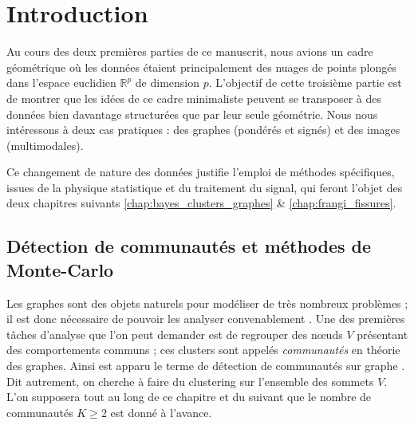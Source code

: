 \chapter{Introduction}
\label{chap:introduction_partie_III}

Au cours des deux premières parties de ce manuscrit, nous avions un cadre géométrique où les données étaient principalement des nuages de points plongés dans l'espace euclidien $\mathbb R^p$ de dimension $p$. 
L'objectif de cette troisième partie est de montrer que les idées de ce cadre minimaliste peuvent se transposer à des données bien davantage structurées que par leur seule géométrie.
Nous nous intéressons à deux cas pratiques : des graphes (pondérés et signés) et des images (multimodales). 

Ce changement de nature des données justifie l'emploi de méthodes spécifiques, issues de la physique statistique et du traitement du signal, qui feront l'objet des deux chapitres suivants \ref{chap:bayes_clusters_graphes} \& \ref{chap:frangi_fissures}.


\section{Détection de communautés et méthodes de Monte-Carlo}

Les graphes sont des objets naturels pour modéliser de très nombreux problèmes ; il est donc nécessaire de pouvoir les analyser convenablement \cite{AvrachenkovDreveton2022}.
Une des premières tâches d'analyse que l'on peut demander est de regrouper des nœuds $V$ présentant des comportements communs ; ces clusters sont appelés \textit{communautés} en théorie des graphes. Ainsi est apparu le terme de détection de communautés sur graphe \cite{Fortunato2010, CherifiPallaSzymanskiLu2019CommunityStructure}.
Dit autrement, on cherche à faire du clustering sur l'ensemble des sommets $V$.
L'on supposera tout au long de ce chapitre et du suivant que le nombre de communautés $K \ge 2$ est donné à l'avance.




